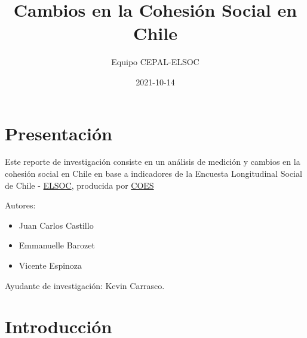 \documentclass[
  12pt,
]{book}
\title{Cambios en la Cohesión Social en Chile}
\author{Equipo CEPAL-ELSOC}
\date{2021-10-14}
\providecommand{\tightlist}{%
  \setlength{\itemsep}{0pt}\setlength{\parskip}{0pt}}
\begin{document}
\maketitle

{
\hypersetup{linkcolor=}
\setcounter{tocdepth}{1}
\tableofcontents
}
\listoftables
\listoffigures
{}
\hypertarget{presentaciuxf3n}{%
\chapter*{Presentación}\label{presentaciuxf3n}}

Este reporte de investigación consiste en un análisis de medición y cambios en la cohesión social en Chile en base a indicadores de la Encuesta Longitudinal Social de Chile - \href{https://coes.cl/encuesta-panel/}{ELSOC}, producida por \href{https://coes.cl/}{COES}

Autores:

\begin{itemize}
\tightlist
\item
  Juan Carlos Castillo
\item
  Emmanuelle Barozet
\item
  Vicente Espinoza
\end{itemize}

Ayudante de investigación: Kevin Carrasco.

\hypertarget{introducciuxf3n}{%
\chapter*{Introducción}\label{introducciuxf3n}}
\end{document}

